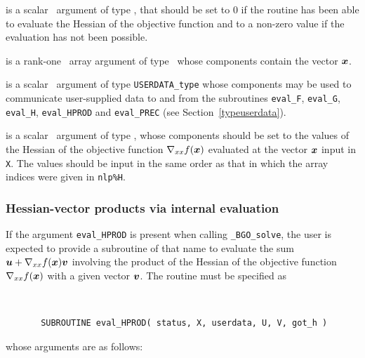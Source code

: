 \documentclass{galahad}
\newcommand{\packagename}{BGO}
\newcommand{\fullpackagename}{\libraryname\_\packagename}
\newcommand{\solver}{{\tt \fullpackagename\_solve}}
\begin{document}
\begin{description}
 is a scalar \intentout\ argument of type \integer,
that should be set to 0 if the routine has been able to evaluate
the Hessian of the objective function
and to a non-zero value if the evaluation has not been possible.

 is a rank-one \intentin\ array argument of type \realdp\
whose components contain the vector ${\bm{x}}$.

 is a scalar \intentinout\ argument of type
{\tt USERDATA\_type} whose components may be used
to communicate user-supplied data to and from the
subroutines {\tt eval\_F}, {\tt eval\_G},
{\tt eval\_H}, {\tt eval\_HPROD} and {\tt eval\_PREC}
(see Section~\ref{typeuserdata}).

 is a scalar \intentout\ argument of type \realdp,
whose components should be set to the values of the Hessian
of the objective function $\nabla_{xx} f({\bm{x}})$
evaluated at the vector ${\bm{x}}$ input in {\tt X}. The values should
be input in the same order as that in which the array indices were
given in {\tt nlp\%H}.

\end{description}


\subsubsection{Hessian-vector products via internal evaluation\label{hvfv}}

If the argument {\tt eval\_HPROD} is present when calling \solver, the
user is expected to provide a subroutine of that name to evaluate the
sum ${\bm{u}} + \nabla_{xx} f({\bm{x}}) {\bm{v}}$ involving the
product of the Hessian of the objective function $\nabla_{xx} f({\bm{x}})$
with a given vector ${\bm{v}}$.
The routine must be specified as

\def\baselinestretch{0.8}
{\tt
\begin{verbatim}
       SUBROUTINE eval_HPROD( status, X, userdata, U, V, got_h )
\end{verbatim} }
\def\baselinestretch{1.0}
\noindent whose arguments are as follows:
\end{document}
